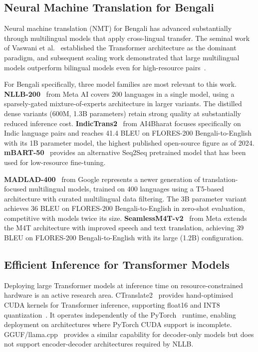 \documentclass[conference]{IEEEtran}
\newcommand{\MADLADBLEU}{36}
\newcommand{\SEAMLESSBLEU}{39}
\begin{document}
\subsection{Neural Machine Translation for Bengali}

Neural machine translation (NMT) for Bengali has advanced substantially through
multilingual models that apply cross-lingual transfer.
The seminal work of Vaswani et al.~\cite{vaswani2017attention} established the
Transformer architecture as the dominant paradigm, and subsequent scaling work
demonstrated that large multilingual models outperform bilingual models even for
high-resource pairs~\cite{arivazhagan2019massively}.

For Bengali specifically, three model families are most relevant to this work.
\textbf{NLLB-200}~\cite{nllb2022} from Meta AI covers 200 languages in a single model,
using a sparsely-gated mixture-of-experts architecture in larger variants.
The distilled dense variants (600M, 1.3B parameters) retain strong quality at
substantially reduced inference cost.
\textbf{IndicTrans2}~\cite{gala2023indictrans2} from AI4Bharat focuses specifically
on Indic language pairs and reaches 41.4 BLEU on FLORES-200 Bengali-to-English with
its 1B parameter model, the highest published open-source figure as of 2024.
\textbf{mBART-50}~\cite{liu2020multilingual} provides an alternative Seq2Seq
pretrained model that has been used for low-resource fine-tuning.

\textbf{MADLAD-400}~\cite{kudugunta2023madlad} from Google represents a newer
generation of translation-focused multilingual models, trained on 400 languages
using a T5-based architecture with curated multilingual data filtering.
The 3B parameter variant achieves \MADLADBLEU{} BLEU on FLORES-200 Bengali-to-English
in zero-shot evaluation, competitive with models twice its size.
\textbf{SeamlessM4T-v2}~\cite{seamlessm4t2023} from Meta extends the M4T architecture
with improved speech and text translation, achieving \SEAMLESSBLEU{} BLEU on
FLORES-200 Bengali-to-English with its large (1.2B) configuration.

\subsection{Efficient Inference for Transformer Models}

Deploying large Transformer models at inference time on resource-constrained hardware
is an active research area.
CTranslate2~\cite{ctranslate2_klein} provides hand-optimised CUDA kernels for
Transformer inference, supporting float16 and INT8 quantization~\cite{dettmers2022llmint8}.
It operates independently of the PyTorch~\cite{pytorch2024} runtime, enabling deployment
on architectures where PyTorch CUDA support is incomplete.
GGUF/llama.cpp~\cite{llamacpp} provides a similar capability for decoder-only models
but does not support encoder-decoder architectures required by NLLB.
\end{document}
